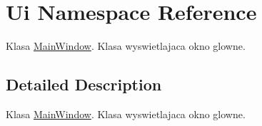 \hypertarget{namespace_ui}{}\section{Ui Namespace Reference}
\label{namespace_ui}


Klasa \hyperlink{class_main_window}{Main\+Window}. Klasa wyswietlajaca okno glowne.  




\subsection{Detailed Description}
Klasa \hyperlink{class_main_window}{Main\+Window}. Klasa wyswietlajaca okno glowne. 